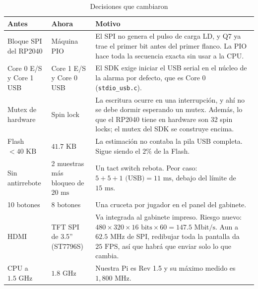 \begin{table}[H]
	\centering
	\caption{Decisiones que cambiaron}
	\label{tab:cambios}
	\small
	\begin{tabular}{|p{1.9cm}|p{1.9cm}|p{3.5cm}|}
		\hline
		\textbf{Antes} & \textbf{Ahora} & \textbf{Motivo} \\
		\hline
		Bloque SPI del RP2040 & Máquina PIO & El SPI no genera el pulso de carga LD, y Q7 ya trae el primer bit antes del primer flanco. La PIO hace toda la secuencia exacta sin usar a la CPU. \\
		\hline
		Core 0 E/S y Core 1 USB & Core 1 E/S y Core 0 USB & El SDK exige iniciar el USB serial en el núcleo de la alarma por defecto, que es Core 0 (\texttt{stdio\_usb.c}). \\
		\hline
		Mutex de hardware & Spin lock & La escritura ocurre en una interrupción, y ahí no se debe dormir esperando un mutex. Además, lo que el RP2040 tiene en hardware son 32 spin locks; el mutex del SDK se construye encima. \\
		\hline
		Flash $< 40\text{ KB}$ & $41.7\text{ KB}$ & La estimación no contaba la pila USB completa. Sigue siendo el $2\%$ de la Flash. \\
		\hline
		Sin antirrebote & 2 muestras más bloqueo de $20\text{ ms}$ & Un tact switch rebota. Peor caso: $5 + 5 + 1\text{ (USB)} = 11\text{ ms}$, debajo del límite de $15\text{ ms}$. \\
		\hline
		10 botones & 8 botones & Una cruceta por jugador en el panel del gabinete. \\
		\hline
		HDMI & TFT SPI de 3.5'' (ST7796S) & Va integrada al gabinete impreso. Riesgo nuevo: $480 \times 320 \times 16\text{ bits} \times 60 = 147.5\text{ Mbit/s}$. Aun a $62.5\text{ MHz}$ de SPI, redibujar toda la pantalla da $25\text{ FPS}$, así que habrá que enviar solo lo que cambia. \\
		\hline
		CPU a $1.5\text{ GHz}$ & $1.8\text{ GHz}$ & Nuestra Pi es Rev 1.5 y su máximo medido es $1{,}800\text{ MHz}$. \\
		\hline
	\end{tabular}
\end{table}
